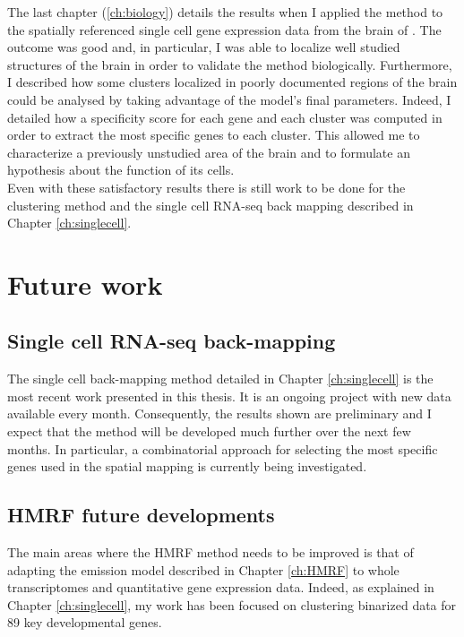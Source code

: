 The last chapter (\ref{ch:biology}) details the results when I applied the method to the spatially referenced single cell gene expression data from the brain of \platyfull{}. The outcome was good and, in particular, I was able to localize well studied structures of the brain in order to validate the method biologically. Furthermore, I described how some clusters localized in poorly documented regions of the brain could be analysed by taking advantage of the model's final parameters. Indeed, I detailed how a specificity score for each gene and each cluster was computed in order to extract the most specific genes to each cluster. This allowed me to characterize a previously unstudied area of the brain and to formulate an hypothesis about the function of its cells. \\
 
  Even with these satisfactory results there is still work to be done for the clustering method and the single cell RNA-seq back mapping described in Chapter \ref{ch:singlecell}.\\
  
\section{Future work}


  \subsection{Single cell RNA-seq back-mapping}
  The single cell back-mapping method detailed in Chapter \ref{ch:singlecell} is the most recent work presented in this thesis. It is an ongoing project with new data available every month. Consequently, the results shown are preliminary and I expect that the method will be developed much further over the next few months. In particular, a combinatorial approach for selecting the most specific genes used in the spatial mapping is currently being investigated.
  
  \subsection{HMRF future developments}
  The main areas where the HMRF method needs to be improved is that of adapting the emission model described in Chapter \ref{ch:HMRF} to whole transcriptomes and quantitative gene expression data. Indeed, as explained in Chapter \ref{ch:singlecell}, my work has been focused on clustering binarized data for 89 key developmental genes.\\
  
